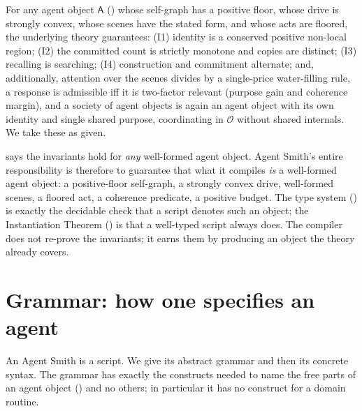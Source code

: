 \documentclass[11pt,twocolumn,a4paper]{article}
\newcommand{\Agent}{\mathsf{A}}
\newcommand{\Out}{\mathcal{O}}
\begin{document}
\begin{principle}
\label{prin:theory}
For any agent object $\Agent$ () whose self-graph has a
positive floor, whose drive is strongly convex, whose scenes have the stated
form, and whose acts are floored, the underlying theory guarantees:
\textup{(I1)} identity is a conserved positive non-local region;
\textup{(I2)} the committed count is strictly monotone and copies are
distinct; \textup{(I3)} recalling is searching; \textup{(I4)} construction and
commitment alternate; and, additionally, attention over the scenes divides by
a single-price water-filling rule, a response is admissible iff it is
two-factor relevant (purpose gain and coherence margin), and a society of
agent objects is again an agent object with its own identity and single shared
purpose, coordinating in $\Out$ without shared internals. We take these as
given.
\end{principle}

\begin{remark}
\label{rem:job}
 says the invariants hold for \emph{any} well-formed agent
object. Agent Smith's entire responsibility is therefore to guarantee that
what it compiles \emph{is} a well-formed agent object: a positive-floor
self-graph, a strongly convex drive, well-formed scenes, a floored act, a
coherence predicate, a positive budget. The type system () is
exactly the decidable check that a script denotes such an object; the
Instantiation Theorem () is that a well-typed script
always does. The compiler does not re-prove the invariants; it earns them by
producing an object the theory already covers.
\end{remark}

\section{Grammar: how one specifies an agent}
\label{sec:grammar}

An Agent Smith is a script. We give its abstract grammar and then its concrete
syntax. The grammar has exactly the constructs needed to name the free parts
of an agent object () and no others; in particular it
has no construct for a domain routine.
\end{document}
